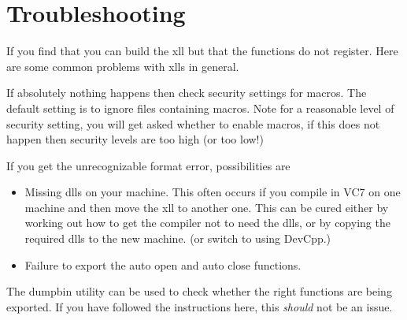\documentclass[12pt,reqno]{amsart}
\numberwithin{equation}{section}
\numberwithin{figure}{section}
\begin{document}
\section{Troubleshooting}

 If you find that you can build the xll but that the functions do not
register. Here are some common problems with xlls in general. 

If absolutely nothing happens then check security settings for
macros. The default setting is to ignore files containing macros. Note
for a reasonable level of security setting, you will get asked whether
to enable macros, if this does not happen then security levels are too
high (or too low!)

If you get the unrecognizable format error, possibilities are

\begin{itemize}
\item Missing dlls on your machine. This often occurs if you compile
  in VC7 on one machine and then move the xll to another one. This can
  be cured either by working out how to get the compiler not to need
  the dlls, or by copying the required dlls to the new machine. (or
  switch to using DevCpp.) 
\item Failure to export the auto open and auto close functions. 
\end{itemize}

The dumpbin utility can be used to check whether the right functions
are being exported. If you have followed the instructions here, this
{\em should} not be an issue.
\end{document}
